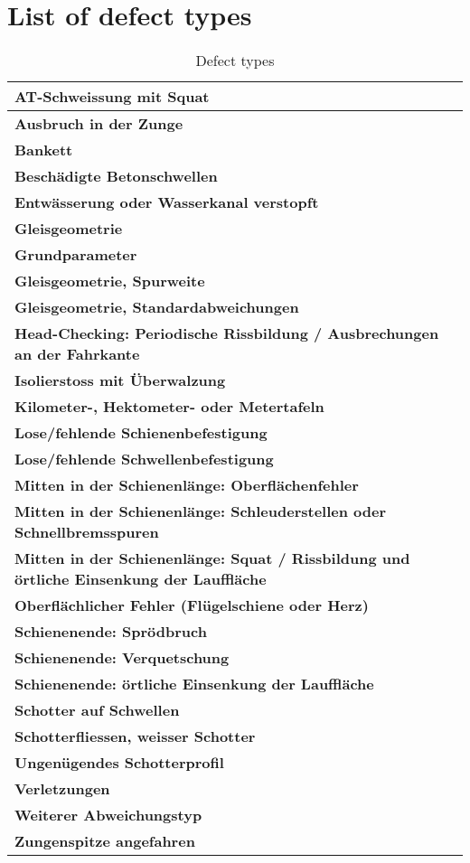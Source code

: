 \section{List of defect types}
\label{app:deftyp}
\begin{table}[H]
	\centering
	\begin{tabular}{|l|} \hline
		\textbf{AT-Schweissung mit Squat}\\ \hline
		\textbf{Ausbruch in der Zunge} \\ \hline
		\textbf{Bankett}\\ \hline
		\textbf{Beschädigte Betonschwellen} \\ \hline 
		\textbf{Entwässerung oder Wasserkanal verstopft}\\ \hline
		\textbf{Gleisgeometrie} \\ \hline
		\textbf{Grundparameter}\\ \hline
		\textbf{Gleisgeometrie, Spurweite} \\ \hline
		\textbf{Gleisgeometrie, Standardabweichungen}\\ \hline
		\textbf{Head-Checking:  Periodische Rissbildung / Ausbrechungen an der Fahrkante} \\ \hline 
		\textbf{Isolierstoss mit Überwalzung}\\ \hline
		\textbf{Kilometer-, Hektometer- oder Metertafeln} \\ \hline
		\textbf{Lose/fehlende Schienenbefestigung}\\ \hline
		\textbf{Lose/fehlende Schwellenbefestigung}\\ \hline
		\textbf{Mitten in der Schienenlänge: Oberflächenfehler}\\ \hline
		\textbf{Mitten in der Schienenlänge: Schleuderstellen oder Schnellbremsspuren}\\ \hline
		\textbf{Mitten in der Schienenlänge: Squat / Rissbildung und örtliche Einsenkung der Lauffläche}\\ \hline
		\textbf{Oberflächlicher Fehler (Flügelschiene oder Herz)}\\ \hline
		\textbf{Schienenende: Sprödbruch}\\ \hline
		\textbf{Schienenende: Verquetschung}\\ \hline
		\textbf{Schienenende: örtliche Einsenkung der Lauffläche}\\ \hline
		\textbf{Schotter auf Schwellen}\\ \hline
		\textbf{Schotterfliessen, weisser Schotter}\\ \hline
		\textbf{Ungenügendes Schotterprofil}\\ \hline
		\textbf{Verletzungen}\\ \hline
		\textbf{Weiterer Abweichungstyp}\\ \hline
		\textbf{Zungenspitze angefahren}\\ \hline
	\end{tabular}
	\caption{Defect types}
\end{table}
